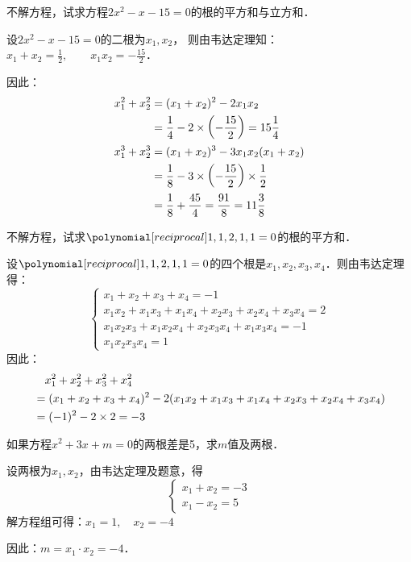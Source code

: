 \begin{example}
    不解方程，试求方程$2x^2-x-15=0$的根的平方和与立方和．
\end{example}


\begin{solution}
    设$2x^2-x-15=0$的二根为$x_1,x_2$，
    则由韦达定理知：$x_1+x_2=\frac{1}{2},\qquad x_1x_2=-\frac{15}{2}$．

    因此：
\[\begin{split}
   x^2_1+x^2_2&=(x_1+x_2)^2-2x_1x_2\\ 
    &=\dfrac{1}{4}-2\times\left(-\dfrac{15}{2}\right)
    =15\dfrac{1}{4}\\
x^3_1+x^3_2&=(x_1+x_2)^3-3x_1x_2(x_1+x_2)\\
&=\dfrac{1}{8}-3\times\left(-\dfrac{15}{2}\right)\times\dfrac{1}{2}\\
&=\dfrac{1}{8}+\dfrac{45}{4}=\dfrac{91}{8}=11\dfrac{3}{8}    
\end{split}\]

\end{solution}


\begin{example}
不解方程，试求$\poly{1,1,2,1,1}=0$的根的平方和．
\end{example}

\begin{solution}
 设$\poly{1,1,2,1,1}=0$的四个根是$x_1,x_2,x_3,x_4$．则由韦达定理得：
\[\begin{cases}
  x_1+x_2+x_3+x_4=-1\\
  x_1x_2+x_1x_3+x_1x_4+x_2x_3+x_2x_4+x_3x_4=2\\
  x_1x_2x_3+x_1x_2x_4+x_2x_3x_4+x_1x_3x_4=-1\\
  x_1x_2x_3x_4=1  
\end{cases}\]
因此：
\[\begin{split}
  &\quad  x^2_1+x_2^2+x_3^2+x_4^2\\
&=(x_1+x_2+x_3+x_4)^2-2(x_1x_2+x_1x_3+x_1x_4+x_2x_3+x_2x_4+x_3x_4)\\
&=(-1)^2-2\times 2=-3
\end{split}\]
\end{solution}

\begin{example}
如果方程$x^2+3x+m=0$的两根差是5，求$m$值及两根．
\end{example}

\begin{solution}
    设两根为$x_1,x_2$，由韦达定理及题意，得
\[\begin{cases}
    x_1+x_2=-3\\
    x_1-x_2=5
\end{cases}\]
解方程组可得：$x_1=1,\quad x_2=-4$

因此：$m=x_1\cdot x_2=-4$．
\end{solution}

